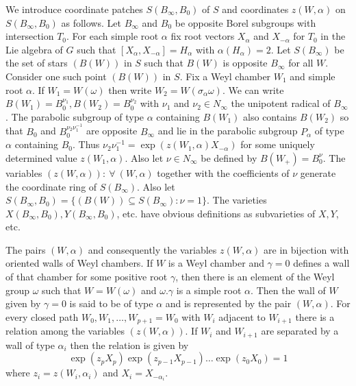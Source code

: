 \documentclass{memo-l}
\theoremstyle{definition}
\theoremstyle{remark}
\numberwithin{section}{chapter}
\numberwithin{equation}{chapter}
\begin{document}
We introduce coordinate patches $S(B_{{\infty}},B_{0})$ of $S$ and
coordinates $z(W,{\alpha})$ on $S(B_{{\infty}},B_{0})$ as follows.
Let $B_{{\infty}}$ and $B_{0}$ be opposite Borel subgroups with
intersection $T_{0}$.  For each simple root ${\alpha}$ fix root
vectors $X_{{\alpha}}$ and $X_{-{\alpha}}$ for $T_{0}$ in the Lie
algebra of $G$ such that $[X_{{\alpha}},X_{-{\alpha}}] = H_{{\alpha}}$
with ${\alpha}(H_{{\alpha}})=2$.  Let $S(B_{{\infty}})$ be the set of
stars $(B(W))$ in $S$ such that $B(W)$ is opposite $B_{{\infty}}$ for
all $W$.  Consider one such point $(B(W))$ in $S$.  Fix a Weyl chamber
$W_{1}$ and simple root ${\alpha}$.  If $W_{1} = W({\omega})$ then
write $W_{2} = W({\sigma}_{{\alpha}}{\omega})$.  We can write
$B(W_{1}) = B_{0}^{\nu_1}, B(W_{2}) = B_{0}^{\nu_2}$ with ${\nu}_{1}$
and ${\nu}_{2} \in N_{{\infty}}$ the unipotent radical of
$B_{{\infty}}$.  The parabolic subgroup of type ${\alpha}$ containing
$B(W_{1})$ also contains $B(W_{2})$ so that $B_{0}$ and
$B_{0}^{\nu_2\nu_1^{-1}}$ are opposite $B_{{\infty}}$ and lie in the
parabolic subgroup $P_{{\alpha}}$ of type ${\alpha}$ containing
$B_{0}$.  Thus ${\nu}_{2}{\nu}_{1}^{-1} =
\exp(z(W_{1},{\alpha})X_{-{\alpha}})$ for some uniquely determined
value $z(W_{1},{\alpha})$.  Also let ${\nu} \in N_{{\infty}}$ be
defined by $B(W_{+}) = B_{0}^{{\nu}}$.  The variables $(z(W,{\alpha}))
: {\ \forall \ } (W,{\alpha})$ together with the coefficients of
${\nu}$ generate the coordinate ring of $S(B_{{\infty}})$.  Also let
$S(B_{{\infty}},B_{0}) = \{(B(W)) {\subseteq} S(B_{{\infty}}) : {\nu}
= 1\}$.  The varieties $X(B_{{\infty}},B_{0}), Y(B_{{\infty}},B_{0})$,
etc.  have obvious definitions as subvarieties of $X, Y$, etc.

The pairs $(W,{\alpha})$ and consequently the variables
$z(W,{\alpha})$ are in bijection with oriented walls of Weyl chambers.
If $W$ is a Weyl chamber and ${\gamma}=0$ defines a wall of that
chamber for some positive root ${\gamma}$, then there is an element of
the Weyl group ${\omega}$ such that $W=W({\omega})$ and
${\omega}.{\gamma}$ is a simple root ${\alpha}$.  Then the wall of $W$
given by ${\gamma}=0$ is said to be of type ${\alpha}$ and is
represented by the pair $(W,{\alpha})$.  For every closed path
$W_{0},W_{1},\ldots ,W_{p+1}=W_{0}$ with $W_{i}$ adjacent to $W_{i+1}$
there is a relation among the variables $(z(W,{\alpha}))$.  If $W_{i}$
and $W_{i+1}$ are separated by a wall of type ${\alpha}_{i}$ then the
relation is given by
$$
\exp(z_{p}X_{p})\exp(z_{p-1}X_{p-1})\ldots \exp(z_{0}X_{0}) = 1
$$
where $z_{i} = z(W_{i},{\alpha}_{i})$ and $X_{i} = X_{-\alpha_i}$.
\end{document}
